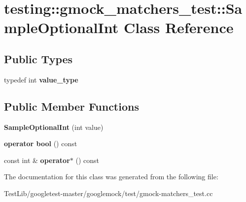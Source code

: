 \hypertarget{classtesting_1_1gmock__matchers__test_1_1SampleOptionalInt}{}\section{testing\+:\+:gmock\+\_\+matchers\+\_\+test\+:\+:Sample\+Optional\+Int Class Reference}
\label{classtesting_1_1gmock__matchers__test_1_1SampleOptionalInt}
\subsection*{Public Types}
\begin{DoxyCompactItemize}
\item 
\mbox{\label{classtesting_1_1gmock__matchers__test_1_1SampleOptionalInt_a9f1309a849993c56be680fc5468bf01a}} 
typedef int {\bfseries value\+\_\+type}
\end{DoxyCompactItemize}
\subsection*{Public Member Functions}
\begin{DoxyCompactItemize}
\item 
\mbox{\label{classtesting_1_1gmock__matchers__test_1_1SampleOptionalInt_aa0e9539a55f97693e24230e5857f7297}} 
{\bfseries Sample\+Optional\+Int} (int value)
\item 
\mbox{\label{classtesting_1_1gmock__matchers__test_1_1SampleOptionalInt_a1e638b606b7e48b395a76304153c8f17}} 
{\bfseries operator bool} () const
\item 
\mbox{\label{classtesting_1_1gmock__matchers__test_1_1SampleOptionalInt_a6b8fbe7ce0f98901e727c2e8e5415eba}} 
const int \& {\bfseries operator$\ast$} () const
\end{DoxyCompactItemize}


The documentation for this class was generated from the following file\+:\begin{DoxyCompactItemize}
\item 
Test\+Lib/googletest-\/master/googlemock/test/gmock-\/matchers\+\_\+test.\+cc\end{DoxyCompactItemize}
